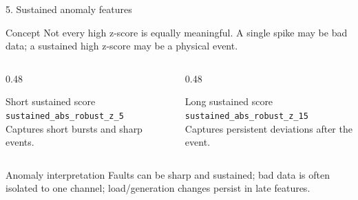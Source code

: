 ﻿\documentclass[10pt,aspectratio=169]{beamer}
\newcommand{\code}[1]{\texttt{\footnotesize #1}}
\begin{document}
\iffalse
\begin{frame}{5. Sustained anomaly features}
\small
\begin{block}{Concept}
Not every high z-score is equally meaningful. A single spike may be bad data; a sustained high z-score may be a physical event.
\end{block}
\begin{columns}[T,totalwidth=\textwidth]
\begin{column}{0.48\textwidth}
\begin{exampleblock}{Short sustained score}
\code{sustained\_abs\_robust\_z\_5}\\
Captures short bursts and sharp events.
\end{exampleblock}
\end{column}
\begin{column}{0.48\textwidth}
\begin{exampleblock}{Long sustained score}
\code{sustained\_abs\_robust\_z\_15}\\
Captures persistent deviations after the event.
\end{exampleblock}
\end{column}
\end{columns}
\vspace{2mm}
\begin{alertblock}{Anomaly interpretation}
Faults can be sharp and sustained; bad data is often isolated to one channel; load/generation changes persist in late features.
\end{alertblock}
\end{frame}
\end{document}
